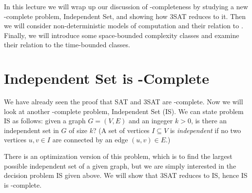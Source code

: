 






In this lecture 
we will wrap up our discussion of \np-completeness 
by studying a new \np-complete problem, Independent Set, and showing
how 3SAT reduces to it.
Then we will consider non-deterministic models of computation and their
relation to \np.  Finally, we will introduce some space-bounded complexity
classes and examine their relation to the time-bounded classes.

\section{Independent Set is \np-Complete}


We have already seen the proof that SAT and 3SAT are \np-complete.
Now we will look at another \np-complete problem, Independent Set (IS).
We can state problem IS as follows: given a graph $G = (V,E)$ and an
ingeger $k > 0$, is there an independent set in $G$ of size $k$?
(A set of vertices $I \subseteq V$ is {\it independent} if no two
vertices $u, v \in I$ are connected by an edge $(u, v) \in E$.)

There is an optimization version of this problem, which is to find the
largest possible independent set of a given graph, but we are simply
interested in the decision problem IS given above.  We will show that
3SAT reduces to IS, hence IS is \np-complete.

